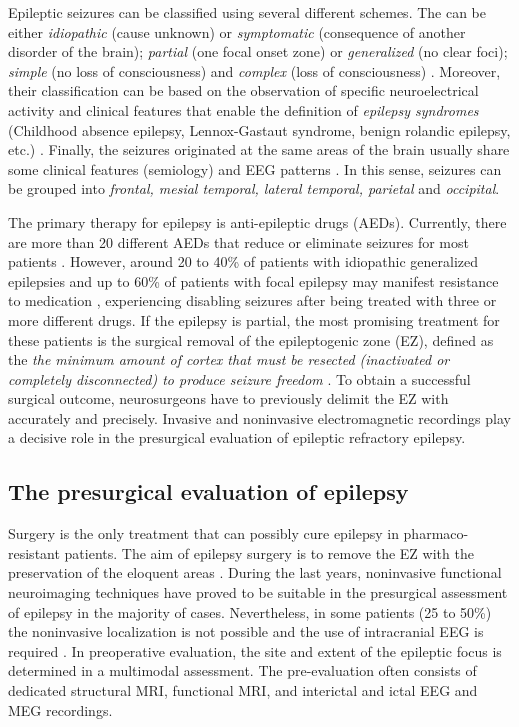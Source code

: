 Epileptic seizures can be classified using several different schemes. The can be either \emph{idiopathic} (cause unknown) or \emph{symptomatic} (consequence of another disorder of the brain); \emph{partial} (one focal onset zone) or \emph{generalized} (no clear foci); \emph{simple} (no loss of consciousness) and \emph{complex} (loss of consciousness) \citep{Frohlich2016}. Moreover, their classification can be based on the observation of specific neuroelectrical activity and clinical features that enable the definition of \emph{epilepsy syndromes} (Childhood absence epilepsy, Lennox-Gastaut syndrome, benign rolandic epilepsy, etc.) . Finally, the seizures originated at the same areas of the brain usually share some clinical features (semiology) and EEG patterns \citep{Kass2017}. In this sense, seizures can be grouped into \textit{frontal, mesial temporal, lateral temporal, parietal} and \textit{occipital}.

The primary therapy for epilepsy is anti-epileptic drugs (AEDs). Currently, there are more than 20 different AEDs that reduce or eliminate seizures for most patients \citep{Franco2014}. However, around 20 to 40\% of patients with idiopathic generalized epilepsies and up to 60\% of patients with focal epilepsy may manifest resistance to medication \citep{Alexpoulos2013}, experiencing disabling seizures after being treated with three or more different drugs. If the epilepsy is partial, the most promising treatment for these patients is the surgical removal of the epileptogenic zone (EZ), defined as the \textit{the minimum amount of cortex that must be resected (inactivated or completely disconnected) to produce seizure freedom} \citep{Luders2006,Jacobs2012}. To obtain a successful surgical outcome, neurosurgeons have to previously delimit the EZ with accurately and precisely. Invasive and noninvasive electromagnetic recordings play a decisive role in the presurgical evaluation of epileptic refractory epilepsy. 

\subsection{The presurgical evaluation of epilepsy}

Surgery is the only treatment that can possibly cure epilepsy in pharmaco-resistant patients. The aim of epilepsy surgery is to remove the EZ with the preservation of the eloquent areas \citep{Rosenow2001}. During the last years, noninvasive functional neuroimaging techniques have proved to be suitable in the presurgical assessment of epilepsy in the majority of cases. Nevertheless, in some patients (25 to 50\%) the noninvasive localization is not possible and the use of intracranial EEG is required \citep{Pittau2014}. In preoperative evaluation, the site and extent of the epileptic focus is determined in a multimodal assessment. The pre-evaluation often consists of dedicated structural MRI, functional MRI, and interictal and ictal EEG and MEG recordings.

